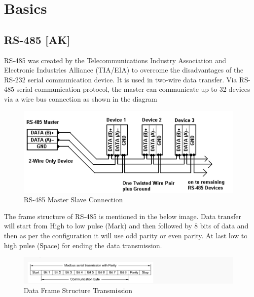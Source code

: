 \section{Basics}

	\subsection{RS-485 [AK]}
		RS-485 was created by the Telecommunications Industry Association and Electronic Industries Alliance (TIA/EIA) to overcome the disadvantages of the RS-232 serial communication device. It is used in two-wire data transfer.  Via RS-485 serial communication protocol, the master can communicate up to 32 devices via a wire bus connection as shown in the diagram
	
		\begin{figure}[H]
			\centering
			\includegraphics{assets/AK-rs485-masterslave.png}
			\caption{RS-485 Master Slave Connection}
			\label{fig:modbus-master-slave}
		\end{figure}
	
	
		The frame structure of RS-485 is mentioned in the below image. Data transfer will start from High to low pulse (Mark) and then followed by 8 bits of data and then as per the configuration it will use odd parity or even parity. At last low to high pulse (Space) for ending the data transmission.
	
		\begin{figure}[H]
			\centering
			\includegraphics{assets/AK-data-frame-transmission.png}
			\caption{Data Frame Structure Transmission}
		\end{figure}
	
